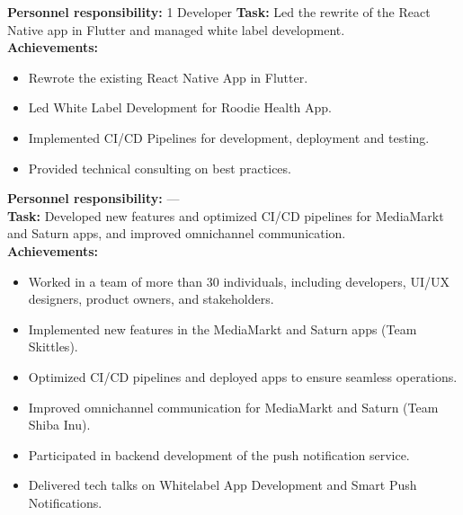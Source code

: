 \documentclass[10pt,a4paper,normalphoto]{altacv}
\begin{document}
\newpage
\begin{fullwidth}
    
\textbf{Personnel responsibility:} 1 Developer 
\textbf{Task:} Led the rewrite of the React Native app in Flutter and managed white label development.\\
\textbf{Achievements:}
\begin{itemize}
    \item Rewrote the existing React Native App in Flutter.
    \item Led White Label Development for Roodie Health App.
    \item Implemented CI/CD Pipelines for development, deployment and testing.
    \item Provided technical consulting on best practices.
\end{itemize}

\vspace{1em}


\vspace{2em}
    
\textbf{Personnel responsibility:} —\\
\textbf{Task:} Developed new features and optimized CI/CD pipelines for MediaMarkt and Saturn apps, and improved omnichannel communication.\\
\textbf{Achievements:}
\begin{itemize}
    \item Worked in a team of more than 30 individuals, including developers, UI/UX designers, product owners, and stakeholders.
    \item Implemented new features in the MediaMarkt and Saturn apps (Team Skittles).
    \item Optimized CI/CD pipelines and deployed apps to ensure seamless operations.
    \item Improved omnichannel communication for MediaMarkt and Saturn (Team Shiba Inu).
    \item Participated in backend development of the push notification service.
    \item Delivered tech talks on Whitelabel App Development and Smart Push Notifications.
\end{itemize}


\end{fullwidth}
\end{document}
